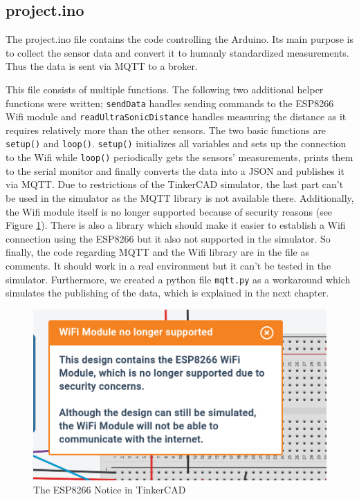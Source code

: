 \documentclass{article}
\begin{document}
\subsection{project.ino}
The project.ino file contains the code controlling the Arduino. Its main purpose is to collect the sensor data and convert it to humanly standardized measurements. Thus the data is sent via MQTT to a broker. \par
This file consists of multiple functions. The following two additional helper functions were written; \texttt{sendData} handles sending commands to the ESP8266 Wifi module and \texttt{readUltraSonicDistance} handles measuring the distance as it requires relatively more than the other sensors. The two basic functions are \texttt{setup()} and \texttt{loop()}. \texttt{setup()} initializes all variables and sets up the connection to the Wifi while \texttt{loop()} periodically gets the sensors' measurements, prints them to the serial monitor and finally converts the data into a JSON and publishes it via MQTT. Due to restrictions of the TinkerCAD simulator, the last part can't be used in the simulator as the MQTT library is not available there. Additionally, the Wifi module itself is no longer supported because of security reasons (see Figure \ref{fig:security}). There is also a library which should make it easier to establish a Wifi connection using the ESP8266 but it also not supported in the simulator. So finally, the code regarding MQTT and the Wifi library are in the file as comments. It should work in a real environment but it can't be tested in the simulator. Furthermore, we created a python file \texttt{mqtt.py} as a workaround which simulates the publishing of the data, which is explained in the next chapter.\par
\begin{figure}
\centering
\includegraphics[scale=0.4]{security.png}
\caption{The ESP8266 Notice in TinkerCAD}
\label{fig:security}
\end{figure}
\end{document}
